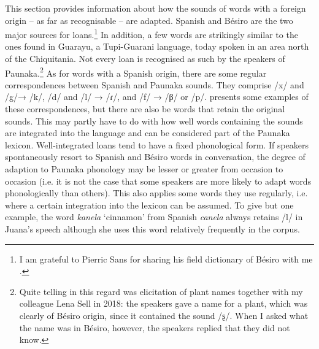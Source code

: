This section provides information about how the sounds of words with a foreign origin – as far as recognisable – are adapted.
Spanish and Bésiro are the two major sources for loans.\footnote{I am grateful to Pierric Sans for sharing his field dictionary of Bésiro with me \citep[]{Sans2011}.} In addition, a few words are strikingly similar to the ones found in Guarayu, a Tupi-Guarani language, today spoken in an area north of the Chiquitania. Not every loan is recognised as such by the speakers of Paunaka.\footnote{Quite telling in this regard was elicitation of plant names together with my colleague Lena Sell in 2018: the speakers gave a name for a plant, which was clearly of Bésiro origin, since it contained the sound /ʂ/. When I asked what the name was in Bésiro, however, the speakers replied that they did not know.} As for words with a Spanish origin, there are some regular correspondences between Spanish and Paunaka sounds. They comprise /x/ and /g/→ /k/, /d/ and /l/ → /ɾ/, and /f/ → /β/ or /p/.  presents some examples of these correspondences, but there are also be words that retain the original sounds. This may partly have to do with how well words containing the sounds are integrated into the language and can be considered part of the Paunaka lexicon. Well-integrated loans tend to have a fixed phonological form. If speakers spontaneously resort to Spanish and Bésiro words in conversation, the degree of adaption to Paunaka phonology may be lesser or greater from occasion to occasion (i.e. it is not the case that some speakers are more likely to adapt words phonologically than others). This also applies some words they use regularly, i.e. where a certain integration into the lexicon can be assumed. To give but one example, the word \textit{kanela} ‘cinnamon’ from Spanish \textit{canela} always retains /l/ in Juana’s speech although she uses this word relatively frequently in the corpus.

